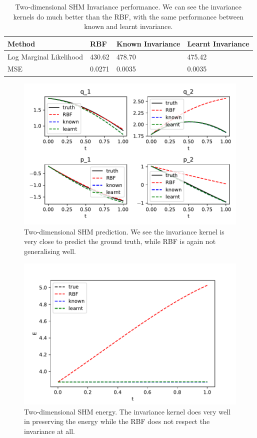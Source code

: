 \documentclass{statsmsc}
\begin{document}
\begin{table}[H]
  \centering
  \begin{tabular}{l l l l}
    \hline
Method           & RBF & Known Invariance&  Learnt Invariance\\
  \hline
Log Marginal Likelihood & 430.62 & 478.70 & 475.42  \\
MSE & 0.0271 & 0.0035 & 0.0035 \\
                    \hline
  \end{tabular}
  \caption{Two-dimensional SHM Invariance performance. We can see the invariance kernels do much better than the RBF, with the same performance between known and learnt invariance.}
  \label{tab:SHM_2d_performance}
\end{table}

\begin{figure}[H] 
  \includegraphics[width=0.8\linewidth]{../codes/figures/shm_2d_predicted.pdf}
  \centering
  \caption{Two-dimensional SHM prediction. We see the invariance kernel is very close to predict the ground truth, while RBF is again not generalising well.}
  \label{fig:shm_2d_prediction}
\end{figure}

\begin{figure}[H] 
  \includegraphics[width=0.8\linewidth]{../codes/figures/shm_2d_energy.pdf}
  \centering
  \caption{Two-dimensional SHM energy. The invariance kernel does very well in preserving the energy while the RBF does not respect the invariance at all.}
  \label{fig:shm_2d_energy}
\end{figure}
\end{document}
